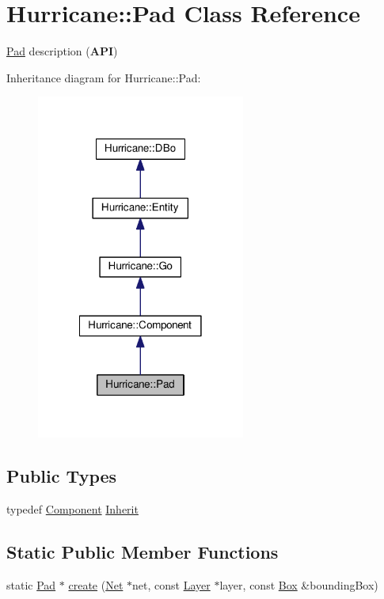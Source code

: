 \hypertarget{classHurricane_1_1Pad}{}\section{Hurricane\+:\+:Pad Class Reference}
\label{classHurricane_1_1Pad}


\hyperlink{classHurricane_1_1Pad}{Pad} description ({\bfseries A\+PI})  




Inheritance diagram for Hurricane\+:\+:Pad\+:\nopagebreak
\begin{figure}[H]
\begin{center}
\leavevmode
\includegraphics[width=194pt]{classHurricane_1_1Pad__inherit__graph}
\end{center}
\end{figure}
\subsection*{Public Types}
\begin{DoxyCompactItemize}
\item 
typedef \hyperlink{classHurricane_1_1Component}{Component} \hyperlink{classHurricane_1_1Pad_aa44130a291ce3cb878d749fbf3e5437e}{Inherit}
\end{DoxyCompactItemize}
\subsection*{Static Public Member Functions}
\begin{DoxyCompactItemize}
\item 
static \hyperlink{classHurricane_1_1Pad}{Pad} $\ast$ \hyperlink{classHurricane_1_1Pad_a0fdf586f9f815d375f54b40bfa027b24}{create} (\hyperlink{classHurricane_1_1Net}{Net} $\ast$net, const \hyperlink{classHurricane_1_1Layer}{Layer} $\ast$layer, const \hyperlink{classHurricane_1_1Box}{Box} \&bounding\+Box)
\end{DoxyCompactItemize}
